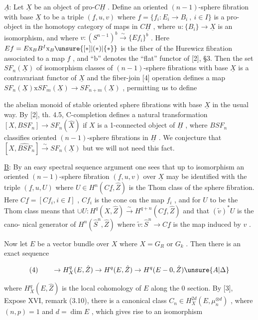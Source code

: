 $\underline{A}$: Let $\underline{X}$ be an object of pro-$C\underline{H}$ . Define an oriented
$(n - 1)$-sphere fibration with base $\underline{X}$ to be a triple $(\underline{f},u,v)$
where $\underline{f} = \{f_{i}{:}E_{i} \to B_{i}\ ,\ i \in I\}$ is a pro-object in the homotopy
category of maps in $C\underline{H}$ , where $u{:}\{B_{i}\} \to \underline{X}$ is an isomorphism,
and where $v{:}(S^{n-1})^{b} \xrightarrow{\sim} \{Ef_{i}\}^{b}$ . Here $Ef = E\mathrm{x}_{B}B^{I}\mathrm{x}_{B}\unsure{[*]|(*)|\{*\}}$ is the
fiber of the Hurewicz fibration associated to a map $f$ , and ``b''
denotes the ``flat'' functor of [2], §3. Then the set $SF_{n}(\underline{X})$ of
isomorphism classes of $(n - 1)$-sphere fibrations with base $\underline{X}$
is a contravariant functor of $\underline{X}$ and the fiber-join [4] operation
defines a map $SF_{n}(\underline{X})\mathrm{x}SF_{m}(\underline{X}) \to SF_{n+m}(\underline{X})$ , permitting us to define



the abelian monoid of stable oriented sphere fibrations with base
$\underline{X}$ in the usual way. By [2], th. 4.5, C-completion defines a
natural transformation $[X,BSF_n] \to SF_n(\hat{X})$ if $X$ is a 1-connected
object of $\underline{H}$ , where $BSF_n$ classifies oriented $(n - 1)$-sphere
fibrations in $\underline{H}$ . We conjecture that $[X,\widehat{BSF}_n] \xrightarrow{\sim} SF_n(\underline{X})$ but we
will not need this fact.

\uline{B}: By an easy spectral sequence argument one sees that up to
isomorphism an oriented $(n - 1)$-sphere fibration $(\underline{f},u,v)$ over $\underline{X}$
may be identified with the triple $(\underline{f},u,U)$ where $U \in H^n(C\underline{f},\hat{Z})$ is
the Thom class of the sphere fibration. Here $C\underline{f} = [Cf_i, i \in I]$ ,
$Cf_i$ is the cone on the map $f_i$ , and for $U$ to be the Thom class
means that $\cup U : H^q(X,\hat{Z}) \xrightarrow{\sim} H^{q+n}(C\underline{f},\hat{Z})$ and that $(\tilde{v})^*U$ is the cano-%
nical generator of $H^n(\hat{S}^n,\hat{Z})$ where $\tilde{v} : \hat{S}^n \to C\underline{f}$ is the map induced
by $v$ .

Now let $E$ be a vector bundle over $X$ where $X = G_R$ or $G_k$ .
Then there is an exact sequence

\[ (4) \qquad \to H^q_X(E,\hat{Z}) \to H^q(E,\hat{Z}) \to H^q(E - 0,\hat{Z}) \unsure{A|\Delta} \]

where $H^q_X(E,\hat{Z})$ is the local cohomology of $E$ along the 0 section.
By [3], Expose XVI, remark (3.10), there is a canonical class
$C_n \in H^{2d}_X(E,\mu_n^{\otimes d})$ , where $(n,p) = 1$ and $d = \dim E$ , which gives
rise to an isomorphism

